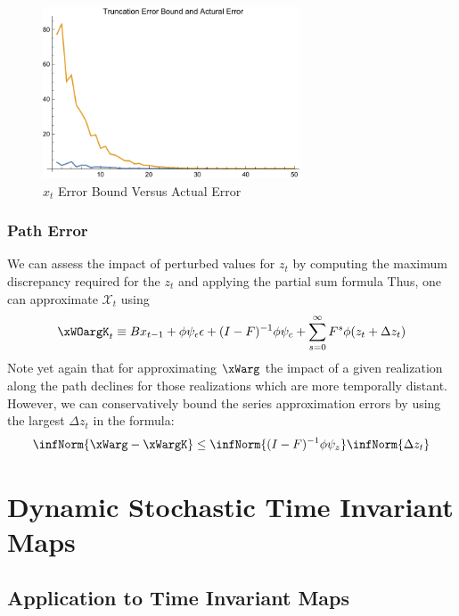 \documentclass[12pt]{article}
\begin{document}
\begin{figure}
  \centering


\includegraphics[width=3in]{arbTruncErr.pdf}  
  \caption{$x_t$ Error Bound Versus Actual Error} \label{figArbTrunc}

\end{figure}

\subsubsection{Path Error}


We can assess the impact of perturbed values for $z_t$ by computing the maximum discrepancy required for the $z_t$ and applying the 
partial sum formula
Thus, one can  approximate $\mathcal{X}_t$ using
 	 \begin{gather}
 	 \xWOargK_t \equiv B x_{t-1}+ \phi \psi_\epsilon\epsilon  + (I - F)^{-1} \phi \psi_c + \sum_{s=0}^\infty F^s \phi (z_{t}+\Delta z_{t})\label{theDeltaSeries}
 \end{gather}
Note yet again that for approximating $\xWarg$ the impact of  a given realization along the path declines for those realizations which are  more temporally distant.
However, we can conservatively bound the  series approximation  errors by using the largest $\Delta z_t$ in the formula:
    \begin{gather}
\infNorm{\xWarg-\xWargK} \le \infNorm{(I -F)^{-1} \phi \psi_z}  \infNorm{\Delta z_t } \label{pathErr}
    \end{gather}


\label{sec:pathnorm}

\section{Dynamic Stochastic Time Invariant Maps}
\label{sec:extToMaps}



\subsection{Application to Time Invariant Maps}
\end{document}
